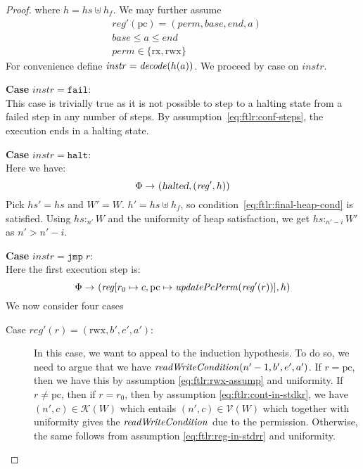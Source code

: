 \documentclass{article}
\newcommand{\var}[1]{\mathit{#1}}
\newcommand{\hs}{\var{hs}}
\newcommand{\pcreg}{\mathrm{pc}}
\newcommand{\addr}{\var{a}}
\newcommand{\start}{\var{base}}
\newcommand{\addrend}{\var{end}}
\newcommand{\reg}{\var{reg}}
\newcommand{\heap}{\var{heap}}
\newcommand{\perm}{\var{perm}}
\newcommand{\instr}{\var{instr}}
\newcommand{\halted}{\textsl{halted}}
\newcommand{\plainfun}[2]{
  \ifthenelse{\equal{#2}{}}
             {\mathit{#1}}
             {\mathit{#1}(#2)}
}
\newcommand{\decode}{\plainfun{decode}{}}
\newcommand{\updatePcPerm}[1]{\plainfun{updatePcPerm}{#1}}
\newcommand{\writeCond}[1]{\plainfun{readWriteCondition}{#1}}
\newcommand{\heapSat}[3][\heap]{#1 :_{#2} #3}
\newcommand{\asmType}{\plaindom{AsmType}}
\newcommand{\plaindom}[1]{\mathrm{#1}}
\newcommand{\intr}[2]{\mathcal{#1}}
\newcommand{\valueintr}[1]{\intr{V}{#1}}
\newcommand{\contintr}[1]{\intr{K}{#1}}
\newcommand{\stdvr}{\valueintr{\asmType}}
\newcommand{\stdkr}{\contintr{\asmType}}
\newcommand{\npair}[2][n]{\left(#1,#2 \right)}
\newcommand{\zinstr}[1]{\mathtt{#1}}
\newcommand{\fail}{\zinstr{fail}}
\newcommand{\halt}{\zinstr{halt}}
\newcommand{\oneinstr}[2]{\zinstr{#1} \; #2}
\newcommand{\jmp}[1]{\oneinstr{jmp}{#1}}
\newcommand{\plainperm}[1]{\mathrm{#1}}
\newcommand{\exec}{\plainperm{rx}}
\newcommand{\rwx}{\plainperm{rwx}}
\newcommand{\step}[1][]{\rightarrow_{#1}}
\begin{document}
\begin{proof}
where $h = \hs \uplus h_f$. We may further assume
\begin{align}
  &\reg'(\pcreg) = (\perm,\start,\addrend,\addr) \nonumber \\
  &\start \leq a \leq  \addrend \nonumber \\
  &\perm \in \{\exec,\rwx\} \nonumber
\end{align}
For convenience define $\instr = \decode(h(a))$. We proceed by case on $\instr$.
\newcommand{\case}[1]{{\bf Case } $\instr=#1$:\\}

\case{\fail} This case is trivially true as it is not possible to step to a halting state from a failed step in any number of steps. By assumption~\ref{eq:ftlr:conf-steps}, the execution ends in a halting state.

\case{\halt} 
Here we have:
\[
  \Phi \step (\halted, (\reg',h))
\]
Pick $\hs' = \hs$ and $W' = W$. $h' = \hs \uplus h_f$, so condition~\ref{eq:ftlr:final-heap-cond} is satisfied. Using $\heapSat[\hs]{n'}{W}$ and the uniformity of heap satisfaction, we get $\heapSat[\hs]{n'-i}{W'}$ as $n' > n'-i$.

\case{\jmp{r}}
Here the first execution step is:
\[
  \Phi \step (\reg[r_0 \mapsto c, \pcreg \mapsto \updatePcPerm{\reg'(r)}],h)
\]
We now consider four cases 
\begin{description}
\item[Case $\reg'(r) = (\rwx,b',e',a')$:] In this case, we want to appeal to the induction hypothesis. To do so, we need to argue that we have $\writeCond{n'-1,b',e',a'}$. If $r=\pcreg$, then we have this by assumption \ref{eq:ftlr:rwx-assump} and uniformity. If $r \neq \pcreg$, then if $r= r_0$, then by assumption \ref{eq:ftlr:cont-in-stdkr}, we have $\npair[n']{c} \in \stdkr(W)$ which entails $\npair[n']{c} \in \stdvr(W)$ which together with uniformity gives the $\writeCond{}$ due to the permission. Otherwise, the same follows from assumption \ref{eq:ftlr:reg-in-stdrr} and uniformity.


\end{description}
\end{proof}
\end{document}
